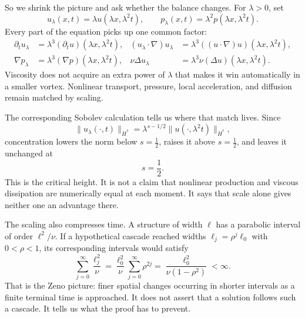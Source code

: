So we shrink the picture and ask whether the balance changes.  For
\(\lambda>0\), set
\[
u_\lambda(x,t)=\lambda u(\lambda x,\lambda^2t),
\qquad
p_\lambda(x,t)=\lambda^2p(\lambda x,\lambda^2t).
\]
Every part of the equation picks up one common factor:
\[
\begin{aligned}
\partial_tu_\lambda
  &=\lambda^3(\partial_tu)(\lambda x,\lambda^2t),
&
(u_\lambda\!\cdot\nabla)u_\lambda
  &=\lambda^3((u\!\cdot\nabla)u)(\lambda x,\lambda^2t),\\
\nabla p_\lambda
  &=\lambda^3(\nabla p)(\lambda x,\lambda^2t),
&
\nu\Delta u_\lambda
  &=\lambda^3\nu(\Delta u)(\lambda x,\lambda^2t).
\end{aligned}
\]
Viscosity does not acquire an extra power of \(\lambda\) that makes it win
automatically in a smaller vortex.  Nonlinear transport, pressure, local
acceleration, and diffusion remain matched by scaling.

The corresponding Sobolev calculation tells us where that match lives.  Since
\[
\|u_\lambda(\cdot,t)\|_{\dot H^s}
=\lambda^{s-1/2}\|u(\cdot,\lambda^2t)\|_{\dot H^s},
\]
concentration lowers the norm below \(s=\tfrac12\), raises it above
\(s=\tfrac12\), and leaves it unchanged at
\[
s=\frac12.
\]
This is the critical height.  It is not a claim that nonlinear production and
viscous dissipation are numerically equal at each moment.  It says that scale
alone gives neither one an advantage there.

The scaling also compresses time.  A structure of width \(\ell\) has a
parabolic interval of order \(\ell^2/\nu\).  If a hypothetical cascade reached
widths \(\ell_j=\rho^j\ell_0\) with \(0<\rho<1\), its corresponding intervals
would satisfy
\[
\sum_{j=0}^{\infty}\frac{\ell_j^2}{\nu}
=\frac{\ell_0^2}{\nu}\sum_{j=0}^{\infty}\rho^{2j}
=\frac{\ell_0^2}{\nu(1-\rho^2)}<\infty.
\]
That is the Zeno picture: finer spatial changes occurring in shorter intervals
as a finite terminal time is approached.  It does not assert that a solution
follows such a cascade.  It tells us what the proof has to prevent.

